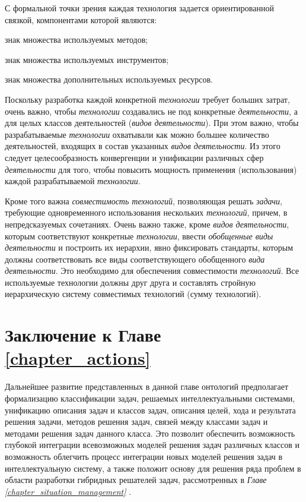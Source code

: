 С формальной точки зрения каждая технология задается ориентированной связкой, компонентами которой являются:
\begin{textitemize}
	\item знак множества используемых методов;
	\item знак множества используемых инструментов;
	\item знак множества дополнительных используемых ресурсов.
\end{textitemize}

Поскольку разработка каждой конкретной \textit{технологии} требует больших затрат, очень важно, чтобы \textit{технологии} создавались не под конкретные \textit{деятельности}, а для целых классов деятельностей (\textit{видов деятельности}). При этом важно, чтобы разрабатываемые \textit{технологии} охватывали как можно большее количество деятельностей, входящих в состав указанных \textit{видов деятельности}. Из этого следует целесообразность конвергенции и унификации различных сфер \textit{деятельности} для того, чтобы повысить мощность применения (использования) каждой разрабатываемой \textit{технологии}.

Кроме того важна \textit{совместимость технологий}, позволяющая решать \textit{задачи}, требующие одновременного использования нескольких \textit{технологий}, причем, в непредсказуемых сочетаниях. Очень важно также, кроме \textit{видов деятельности}, которым соответствуют конкретные \textit{технологии}, ввести \textit{обобщенные виды деятельности} и построить их иерархии, явно фиксировать стандарты, которым должны соответствовать все виды соответствующего обобщенного \textit{вида деятельности}. Это необходимо для обеспечения совместимости \textit{технологий}. Все используемые технологии должны  друг друга и составлять стройную иерархическую систему совместимых технологий (сумму технологий).

\section*{Заключение к Главе \ref{chapter_actions}}

Дальнейшее развитие представленных в данной главе онтологий предполагает формализацию классификации задач, решаемых интеллектуальными системами, унификацию описания задач и классов задач, описания целей, хода и результата решения задачи, методов решения задач, связей между классами задач и методами решения задач данного класса.
Это позволит обеспечить возможность глубокой интеграции всевозможных моделей решения задач различных классов и возможность облегчить процесс интеграции новых моделей решения задач в интеллектуальную систему, а также положит основу для решения ряда проблем в области разработки гибридных решателей задач, рассмотренных в \textit{Главе \ref{chapter_situation_management} }.

%